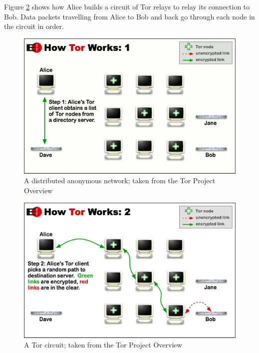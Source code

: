 \documentclass[11pt]{book} %
\begin{document}
Figure \ref{fig:torCircuit} shows how Alice builds a circuit of Tor relays to relay its connection to Bob. Data packets travelling from Alice to Bob and back go through each node in the circuit in order. 

\begin{figure}[h!]
\begin{center}
\includegraphics[scale=0.7]{htw1}
\end{center}
 \caption{A distributed anonymous network; taken from the Tor Project Overview \citep*{web:torOverview}}
 \label{fig:torNetwork}
 \end{figure}

\begin{figure}[h!]
\begin{center}
\includegraphics[scale=0.7]{htw2}
\end{center}
 \caption{A Tor circuit; taken from the Tor Project Overview \citep*{web:torOverview}}
 \label{fig:torCircuit}
 \end{figure}
\end{document}
